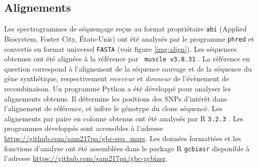 
\newpage

\subsection{Alignements}
\label{subsec:align}

Les spectrogrammes de séquençage reçus au format propriétaire \texttt{abi}
(Applied Biosystem, Foster City, États-Unis) ont été analysés par le programme
\texttt{phred} \cite{ewing_base-calling_1998} et convertis en format universel
\texttt{FASTA} (voir figure \ref{img:align}). Les séquences obtenues ont été
alignées à la référence par \texttt{ muscle v3.8.31} \cite{edgar_muscle:_2004}.
La référence en question correspond à l'alignement de la séquence sauvage et de
la séquence du gène synthétique, respectivement \emph{receveur} et
\emph{donneur} de l'évènement de recombinaison. Un programme Python
\cite{cock_biopython:_2009} a été développé pour analyser les alignements
obtenus. Il détermine les positions des SNPs d'intérêt dans l'alignement de
référence, et infère le génotype du clone séquencé. Les alignements par paire
en colonne obtenus ont été analysés par \textrm{R} \texttt{3.2.3}
\cite{r_core_team_r:_2015}. Les programmes développés sont accessibles à
l'adresse \url{https://github.com/sam217pa/gbc-seq_mars}. Les données formattées
et les fonctions d'analyse ont été assemblées dans le package \textrm{R}
\texttt{gcbiasr} disponible à l'adresse
\url{https://github.com/sam217pa/gbc-gcbiasr}.
